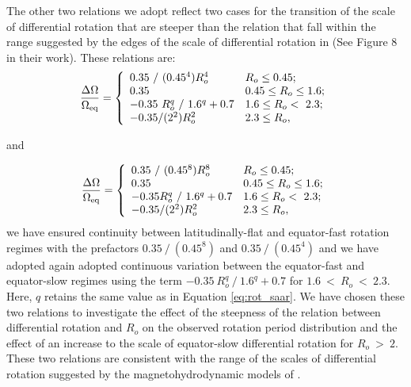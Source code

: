 The other two relations we adopt reflect two cases for the transition of the scale of differential rotation that are steeper than the \citet{saar_starspots_2011} relation that fall within the range suggested by the edges of the scale of differential rotation in \citet{brun_powering_2022} (See Figure 8 in their work).
These relations are:
\begin{equation}
\label{eq:rot_pow4}
{\centering
\frac{\Delta\Omega}{\Omega_{\rm{eq}}} = \left\{
\begin{array}{ll}
 0.35 \ / \ (0.45^4) R_o^4& R_o\leq 0.45; \\
 0.35 & 0.45\leq R_o\leq 1.6; \\
 -0.35 \ R_o^q \ / \ 1.6^q + 0.7 & 1.6 \leq R_o < \ 2.3;\\
 -0.35/(2^2) R_o^2& 2.3\leq R_o, \\
\end{array} 
\right.}
\end{equation}

and

\begin{equation}
\label{eq:rot_pow6}
{\centering
\frac{\Delta\Omega}{\Omega_{\rm{eq}}} = \left\{
\begin{array}{ll}
 0.35 \ / \ (0.45^8) R_o^8& R_o\leq 0.45; \\
 0.35 & 0.45\leq R_o\leq 1.6; \\
 -0.35 R_o^q \ / \ 1.6^q + 0.7 & 1.6 \leq R_o < \ 2.3;\\
 -0.35/(2^2) R_o^2 & 2.3\leq R_o, \\
\end{array} 
\right.}
\end{equation}
we have ensured continuity between latitudinally-flat and equator-fast rotation regimes with the prefactors $0.35 \ / \ (0.45^8)$ and $0.35 \ / \ (0.45^4)$ and we have adopted again adopted continuous variation between the equator-fast and equator-slow regimes using the term $-0.35 \ R_o^q \ / \ 1.6^q + 0.7$ for $1.6 \ < \ R_o \ < \ 2.3$.
Here, $q$ retains the same value as in Equation \ref{eq:rot_saar}.
We have chosen these two relations to investigate the effect of the steepness of the relation between differential rotation and $R_o$ on the observed rotation period distribution and the effect of an increase to the scale of equator-slow differential rotation for $R_o \ > \ 2$.
These two relations are consistent with the range of the scales of differential rotation suggested by the magnetohydrodynamic models of \citet{brun_powering_2022}.

